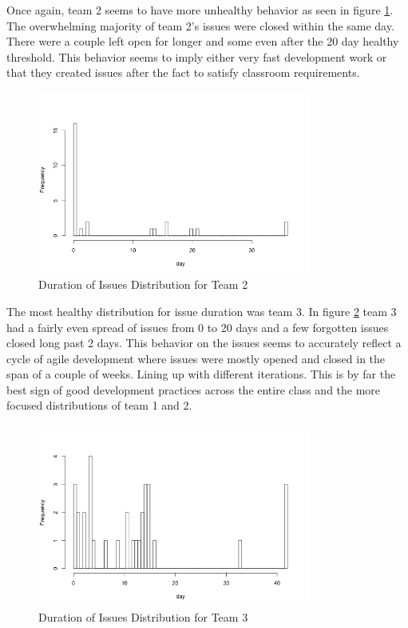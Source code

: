 \documentclass[conference]{IEEEtran}
\begin{document}
Once again, team 2 seems to have more unhealthy behavior as seen in figure \ref{issue_duration_team2}. The overwhelming majority of team 2's issues were closed within the same day. There were a couple left open for longer and some even after the 20 day healthy threshold. This behavior seems to imply either very fast development work or that they created issues after the fact to satisfy classroom requirements. 

\begin{figure}[H]
    \centering
    \includegraphics[width=9cm]{../AprilProject/pic/distribution/issue_duration_distribution_team2.png}
    \caption{Duration of Issues Distribution for Team 2}
    \label{issue_duration_team2}
\end{figure}

The most healthy distribution for issue duration was team 3. In figure \ref{issue_duration_team3} team 3 had a fairly even spread of issues from 0 to 20 days and a few forgotten issues closed long past 2 days. This behavior on the issues seems to accurately reflect a cycle of agile development where issues were mostly opened and closed in the span of a couple of weeks. Lining up with different iterations. This is by far the best sign of good development practices across the entire class and the more focused distributions of team 1 and 2. 

\begin{figure}[H]
    \centering
    \includegraphics[width=9cm]{../AprilProject/pic/distribution/issue_duration_distribution_team3.png}
    \caption{Duration of Issues Distribution for Team 3}
    \label{issue_duration_team3}
\end{figure}
\end{document}
